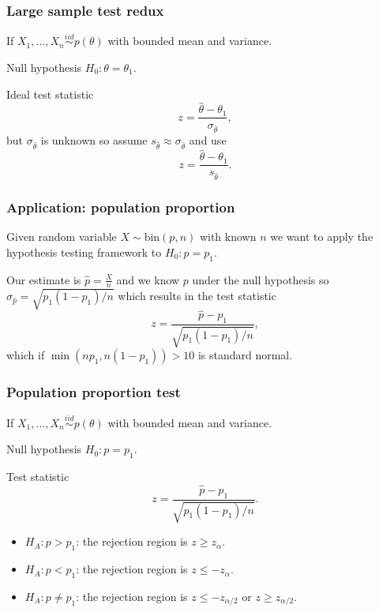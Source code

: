 \begin{frame}[fragile]\frametitle{Large sample test redux}

If $X_1,...,X_n \stackrel{iid}{\sim} p(\theta)$
with bounded mean and variance.

Null hypothesis $H_0: \theta = \theta_1$.

Ideal test statistic 
$$z = \frac{\hat{\theta}-\theta_1}{\sigma_{\hat{\theta}}},$$
but $\sigma_{\hat{\theta}}$ is unknown so assume 
$s_{\hat{\theta}} \approx \sigma_{\hat{\theta}}$ and use
$$z = \frac{\hat{\theta}-\theta_1}{s_{\hat{\theta}}}.$$
\end{frame}




\begin{frame}[fragile]\frametitle{Application: population proportion}

{\tiny

Given random variable $X \sim \mbox{bin}(p,n)$ with known
$n$ we want to apply the hypothesis testing framework to
$H_0: p= p_1$.

Our estimate is $\hat{p} = \frac{X}{n}$ and we know $p$
under the null hypothesis so $\sigma_{\hat p} = \sqrt{p_1(1-p_1)/n}$
which results in the test statistic
$$z = \frac{\hat{p}-p_1}{\sqrt{p_1(1-p_1)/n}},$$
which if $\min(np_1,n(1-p_1)) > 10$ is standard normal.
}
\end{frame}



\begin{frame}[fragile]\frametitle{Population proportion test}

{\tiny

If $X_1,...,X_n \stackrel{iid}{\sim} p(\theta)$
with bounded mean and variance.

Null hypothesis $H_0: p= p_1$.

Test statistic $$z = \frac{\hat{p}-p_1}{\sqrt{p_1(1-p_1)/n}}.$$

\begin{itemize}

\item $H_A: p > p_1$: the rejection region is $z \geq z_{\alpha}$.
\item $H_A: p < p_1$: the rejection region is $z \leq -z_{\alpha}$.
\item $H_A: p \neq p_1$: the rejection region is $z \leq
  -z_{\alpha/2}$ or $z \geq z_{\alpha/2}$.

\end{itemize}
}

\end{frame}


